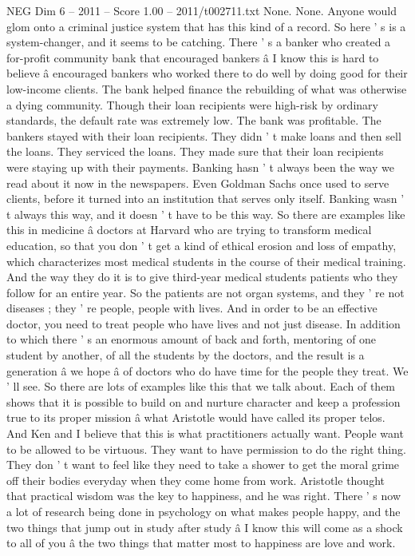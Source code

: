 \begin{textsample}{NEG Dim 6 – 2011 – Score 1.00 – 2011/t002711.txt}
None.
None.
Anyone would glom onto a criminal justice system that has this kind of a record.
So here ' s is a system-changer, and it seems to be catching.
There ' s a banker who created a for-profit community bank that encouraged bankers â I know this is hard to believe â encouraged bankers who worked there to do well by doing good for their low-income clients.
The bank helped finance the rebuilding of what was otherwise a dying community.
Though their loan recipients were high-risk by ordinary standards, the default rate was extremely low.
The bank was profitable.
The bankers stayed with their loan recipients.
They didn ' t make loans and then sell the loans.
They serviced the loans.
They made sure that their loan recipients were staying up with their payments.
Banking hasn ' t always been the way we read about it now in the newspapers.
Even Goldman Sachs once used to serve clients, before it turned into an institution that serves only itself.
Banking wasn ' t always this way, and it doesn ' t have to be this way.
So there are examples like this in medicine â doctors at Harvard who are trying to transform medical education, so that you don ' t get a kind of ethical erosion and loss of empathy, which characterizes most medical students in the course of their medical training.
And the way they do it is to give third-year medical students patients who they follow for an entire year.
So the patients are not organ systems, and they ' re not diseases ; they ' re people, people with lives.
And in order to be an effective doctor, you need to treat people who have lives and not just disease.
In addition to which there ' s an enormous amount of back and forth, mentoring of one student by another, of all the students by the doctors, and the result is a generation â we hope â of doctors who do have time for the people they treat.
We ' ll see.
So there are lots of examples like this that we talk about.
Each of them shows that it is possible to build on and nurture character and keep a profession true to its proper mission â what Aristotle would have called its proper telos.
And Ken and I believe that this is what practitioners actually want.
People want to be allowed to be virtuous.
They want to have permission to do the right thing.
They don ' t want to feel like they need to take a shower to get the moral grime off their bodies everyday when they come home from work.
Aristotle thought that practical wisdom was the key to happiness, and he was right.
There ' s now a lot of research being done in psychology on what makes people happy, and the two things that jump out in study after study â I know this will come as a shock to all of you â the two things that matter most to happiness are love and work.

\end{textsample}
